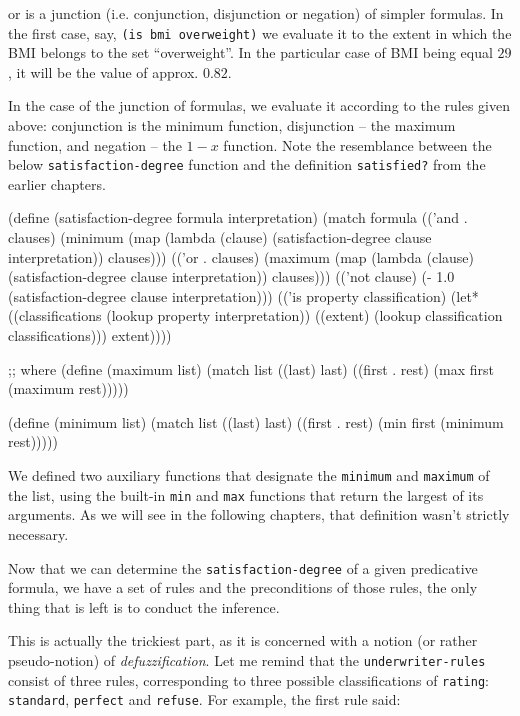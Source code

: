 or is a junction (i.e. conjunction, disjunction or negation)
of simpler formulas. In the first case, say, 
\texttt{(is bmi overweight)} we evaluate it to the extent
in which the BMI belongs to the set ``overweight''.
In the particular case of BMI being equal $29$, it will
be the value of approx. $0.82$.

In the case of the junction of formulas, we evaluate
it according to the rules given above: conjunction
is the minimum function, disjunction -- the maximum
function, and negation -- the $1-x$ function.
Note the resemblance between the below
\texttt{satisfaction-degree} function and
the definition \texttt{satisfied?} from the earlier chapters.

\begin{Snippet}
(define (satisfaction-degree formula interpretation)
  (match formula
    (('and . clauses)
     (minimum (map (lambda (clause)
		       (satisfaction-degree clause interpretation))
		     clauses)))
    (('or . clauses)
     (maximum (map (lambda (clause)
		       (satisfaction-degree clause interpretation))
		     clauses)))
    (('not clause)
     (- 1.0 (satisfaction-degree clause interpretation)))
    (('is property classification)
     (let* ((classifications (lookup property interpretation))
	    ((extent) (lookup classification classifications)))
       extent))))
\end{Snippet}
\begin{Snippet}
;; where
(define (maximum list)
  (match list
    ((last)
     last)
    ((first . rest)
     (max first (maximum rest)))))

(define (minimum list)
  (match list
    ((last)
     last)
    ((first . rest)
     (min first (minimum rest)))))
\end{Snippet}

We defined two auxiliary functions that designate
the \texttt{minimum} and \texttt{maximum} of the list,
using the built-in \texttt{min} and \texttt{max}
functions that return the largest of its arguments.
As we will see in the following chapters, that definition
wasn't strictly necessary.

Now that we can determine the \texttt{satisfaction-degree}
of a given predicative formula, we have a set of rules
and the preconditions of those rules, the only thing
that is left is to conduct the inference.

This is actually the trickiest part, as it is concerned
with a notion (or rather pseudo-notion) of \textit{defuzzification}.
Let me remind that the \texttt{underwriter\--rules} consist
of three rules, corresponding to three possible classifications
of \texttt{rating}: \texttt{standard}, \texttt{perfect} and
\texttt{refuse}. For example, the first rule said:

